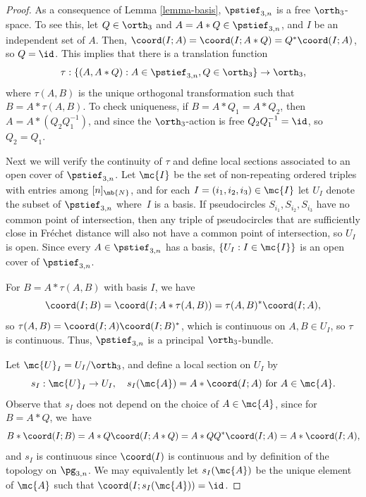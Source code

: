 \begin{proof}
As a consequence of Lemma \ref{lemma-basis}, $\pstief_{3,n}$ is a free $\orth_3$-space. To see this, let $Q \in \orth_3$ and $A = A*Q \in \pstief_{3,n}$, and $I$ be an independent set of $A$. Then, $\coord(I;A) = \coord(I;A*Q) = Q^* \coord(I;A)$, so $Q = \id$.
This implies that there is a translation function
\[ \tau : \{(A,A*Q): A \in \pstief_{3,n}, Q \in \orth_3 \} \to \orth_3, \]
where $\tau(A,B)$ is the unique orthogonal transformation such that $B = A*\tau(A,B)$.
To check uniqueness, if $B = A*Q_1 = A*Q_2$, then $A = A*(Q_2 Q_1^{-1})$, and since the $\orth_3$-action is free $Q_2 Q_1^{-1} = \id$, so $Q_2=Q_1$.

Next we will verify the continuity of $\tau$ and define local sections associated to an open cover of $\pstief_{3,n}$.
Let $\mc{I}$ be the set of non-repeating ordered triples with entries among $[n]_\mb{N}$, and for each $I = (i_1,i_2,i_3) \in \mc{I}$ let $U_I$ denote the subset of $\pstief_{3,n}$ where~$I$ is a basis.
If pseudocircles $S_{i_1},S_{i_2},S_{i_3}$ have no common point of intersection, then any triple of pseudocircles that are sufficiently close in Fréchet distance will also not have a common point of intersection, so $U_I$ is open. Since every $A \in \pstief_{3,n}$ has a basis, $\{U_I : I \in \mc{I}\}$ is an open cover of $\pstief_{3,n}$.

For $B = A*\tau(A,B)$ with basis $I$, we have
\[
\coord(I;B) = \coord(I;A*\tau(A,B)) = \tau(A,B)^*\coord(I;A),
\]
so $\tau(A,B) = \coord(I;A)\coord(I;B)^*$, which is continuous on $A,B \in U_I$, so $\tau$ is continuous.
Thus, $\pstief_{3,n}$ is a principal $\orth_3$-bundle.

Let $\mc{U}_I = U_I/\orth_3$, and define a local section on $U_I$ by
\[ s_I : \mc{U}_I \to U_I, \quad s_I(\mc{A}) = A *\coord(I;A) \text{ for } A \in \mc{A}. \]
Observe that $s_I$ does not depend on the choice of $A \in \mc{A}$, since for $B = A*Q$, we~have
\[
B *\coord(I;B) = A*Q \coord(I;A*Q) = A*Q Q^* \coord(I;A) = A*\coord(I;A),
\]
and $s_I$ is continuous since $\coord(I)$ is continuous and by definition of the topology on $\pg_{3,n}$.
We may equivalently let $s_I(\mc{A})$ be the unique element of $\mc{A}$ such that $\coord(I;s_I(\mc{A})) = \id$.


\end{proof}
